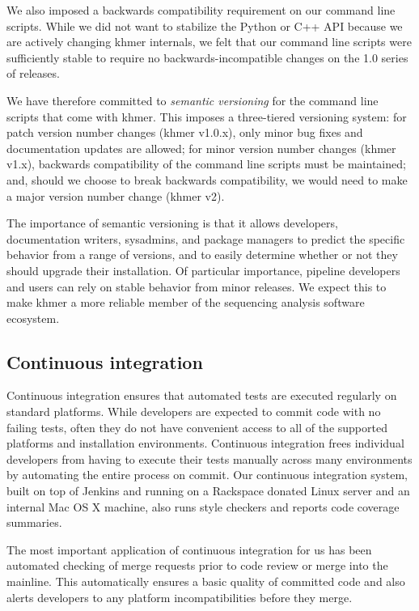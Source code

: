 \documentclass[12pt]{article}
\begin{document}
We also imposed a backwards compatibility requirement on our command
line scripts.  While we did not want to stabilize the Python or C++
API because we are actively changing khmer internals, we felt that
our command line scripts were sufficiently stable to require no
backwards-incompatible changes on the 1.0 series of releases.

We have therefore committed to {\em semantic versioning}\cite{semver} for the
command line scripts that come with khmer.  This imposes a
three-tiered versioning system: for patch version number changes
(khmer v1.0.x), only minor bug fixes and documentation updates are
allowed; for minor version number changes (khmer v1.x), backwards
compatibility of the command line scripts must be maintained; and,
should we choose to break backwards compatibility, we would need to
make a major version number change (khmer v2).

The importance of semantic versioning is that it allows developers,
documentation writers, sysadmins, and package managers to predict the
specific behavior from a range of versions, and to easily determine
whether or not they should upgrade their installation.  Of particular
importance, pipeline developers and users can rely on stable behavior
from minor releases.  We expect this to make khmer a more reliable
member of the sequencing analysis software ecosystem.

\subsection{Continuous integration}

Continuous integration ensures that automated tests are executed
regularly on standard platforms.  While developers are expected to
commit code with no failing tests, often they do not have convenient
access to all of the supported platforms and installation
environments.  Continuous integration frees individual developers from
having to execute their tests manually across many environments by
automating the entire process on commit.  Our continuous integration
system, built on top of Jenkins and running on a Rackspace donated
Linux server and an internal Mac OS X machine, also runs style
checkers and reports code coverage summaries.

The most important application of continuous integration for us has
been automated checking of merge requests prior to code review or
merge into the mainline.  This automatically ensures a basic quality
of committed code and also alerts developers to any platform
incompatibilities before they merge.
\end{document}
